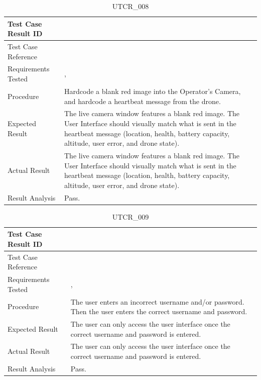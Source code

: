 \documentclass[12pt, titlepage]{article}
\begin{document}
\begin{table}[!h]
\begin{center}
\caption {UTCR\_008}
\label{tab:UTCR_008}
\begin{tabular}{ | m{3.2cm} | m{12.2cm} | } 
\hline
Test Case Result ID & \nameref{tab:UTCR_008} \\ 
\hline
Test Case Reference & \nameref{tab:UTC_008}  \\ 
\hline
Requirements Tested & \nameref{USE_005}, \nameref{SR_002} \\ 
\hline
Procedure & Hardcode a blank red image into the Operator's Camera, and hardcode a heartbeat message from the drone. \\ 
\hline
Expected Result & The live camera window features a blank red image. The User Interface should visually match what is sent in the heartbeat message (location, health, battery capacity, altitude, user error, and drone state). \\ 
\hline
Actual Result & The live camera window features a blank red image. The User Interface should visually match what is sent in the heartbeat message (location, health, battery capacity, altitude, user error, and drone state). \\ 
\hline
Result Analysis & Pass. \\ 
\hline
\end{tabular}
\end{center}
\end{table}

\begin{table}[!h]
\begin{center}
\caption {UTCR\_009}
\label{tab:UTCR_009}
\begin{tabular}{ | m{3.2cm} | m{12.2cm} | } 
\hline
Test Case Result ID & \nameref{tab:UTCR_009} \\ 
\hline
Test Case Reference & \nameref{tab:UTC_009}  \\ 
\hline
Requirements Tested & \nameref{SR_013}, \nameref{SEC_001} \\ 
\hline
Procedure & The user enters an incorrect username and/or password. Then the user enters the correct username and password. \\ 
\hline
Expected Result & The user can only access the user interface once the correct username and password is entered. \\ 
\hline
Actual Result & The user can only access the user interface once the correct username and password is entered. \\ 
\hline
Result Analysis & Pass. \\ 
\hline
\end{tabular}
\end{center}
\end{table}
\end{document}
